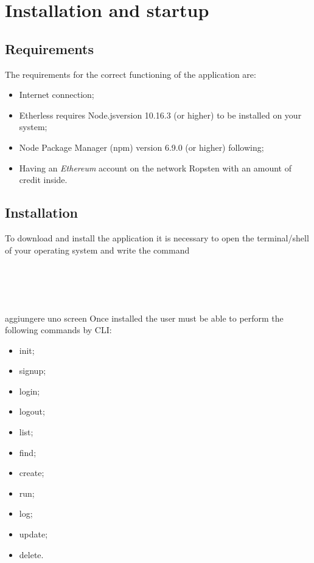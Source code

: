 \section{Installation and startup}
\subsection{Requirements}
The requirements for the correct functioning of the application are:
\begin{itemize}
	\item Internet connection;
	\item Etherless requires Node.js\glo version 10.16.3 (or higher) to be installed on your system;
	\item Node Package Manager (npm) version 6.9.0 (or higher) following;
	\item Having an \textit{Ethereum\glo} account on the network Ropsten with an amount of credit inside.
\end{itemize}
\subsection{Installation}
To download and install the application it is necessary to open the terminal/shell of your operating system and write the command \\
\\
\centerline{}\\
\\
\\
aggiungere uno screen
Once installed the user must be able to perform the following commands by CLI\glo: 
\begin{itemize}
	\item init;
	\item signup;
	\item login;
	\item logout;
	\item list;
	\item find;
	\item create;
	\item run;
	\item log;
	\item update;
	\item delete.

\end{itemize}